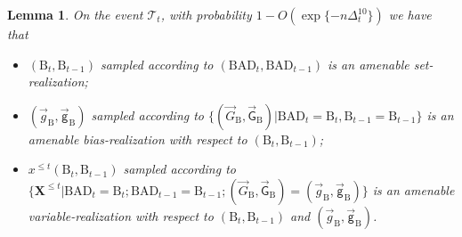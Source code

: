 \documentclass[11pt]{article}
\newtheorem{Lemma}[Theorem]{Lemma}
\numberwithin{equation}{section}
\begin{document}
\begin{Lemma} \label{lem-good-set-good-variable-realization}
On the event $\mathcal{T}_t$, with probability $1 - O( \exp \{ - n \Delta_t^{10} \} )$ we have that 
\begin{itemize}
\item $( \mathrm{B}_t, \mathrm{B}_{t-1})$ sampled according to $(\mathrm{BAD}_t, \mathrm{BAD}_{t-1})$ is an amenable set-realization;
\item  $(\overrightarrow{g}_{\mathrm{B}}, \overrightarrow{\mathsf{g}}_{\mathrm{B}})$  sampled according to  $ \{ (\overrightarrow{G}_{\mathrm{B}}, \overrightarrow{\mathsf{G}}_{\mathrm{B}}) | \mathrm{BAD}_t = \mathrm{B}_t, \mathrm{B}_{t-1} = \mathrm{B}_{t-1} \}$  is an amenable bias-realization with respect to $(\mathrm{B}_t, \mathrm{B}_{t-1})$;
\item $x^{\leq t} (\mathrm{B}_t, \mathrm{B}_{t-1})$ sampled according to  $\{ \mathbf{X}^{\leq t} | \mathrm{BAD}_t = \mathrm{B}_t ; \mathrm{BAD}_{t-1} = \mathrm{B}_{t-1}; (\overrightarrow{G}_{\mathrm{B}}, \overrightarrow{\mathsf{G}}_{\mathrm{B}}) = (\overrightarrow{g}_{\mathrm{B}}, \overrightarrow{\mathsf{g}}_{\mathrm{B}})\}$ is an amenable variable-realization with respect to $(\mathrm{B}_t, \mathrm{B}_{t-1})$ and $(\overrightarrow{g}_{\mathrm{B}}, \overrightarrow{\mathsf{g}}_{\mathrm{B}})$.
\end{itemize}
\end{Lemma}
\end{document}
